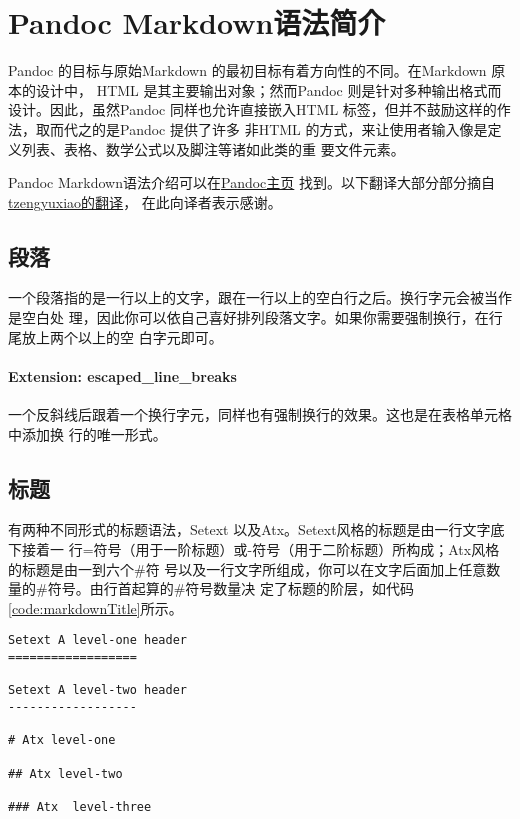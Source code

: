 \documentclass[cn]{elegantbook}
\begin{document}
\hypertarget{pandoc-markdownux8bedux6cd5ux7b80ux4ecb}{%
\chapter{Pandoc
Markdown语法简介}\label{pandoc-markdownux8bedux6cd5ux7b80ux4ecb}}

Pandoc 的目标与原始Markdown 的最初目标有着方向性的不同。在Markdown
原本的设计中， HTML 是其主要输出对象；然而Pandoc
则是针对多种输出格式而设计。因此，虽然Pandoc 同样也允许直接嵌入HTML
标签，但并不鼓励这样的作法，取而代之的是Pandoc 提供了许多 非HTML
的方式，来让使用者输入像是定义列表、表格、数学公式以及脚注等诸如此类的重
要文件元素。

Pandoc
Markdown语法介绍可以在\href{http://www.pandoc.org/MANUAL.html\#pandocs-markdown}{Pandoc主页}
找到。以下翻译大部分部分摘自\href{http://pages.tzengyuxio.me/pandoc/}{tzengyuxiao的翻译}，
在此向译者表示感谢。

\hypertarget{ux6bb5ux843d}{%
\section{段落}\label{ux6bb5ux843d}}

一个段落指的是一行以上的文字，跟在一行以上的空白行之后。换行字元会被当作是空白处
理，因此你可以依自己喜好排列段落文字。如果你需要强制换行，在行尾放上两个以上的空
白字元即可。

\hypertarget{extension-escaped_line_breaks}{%
\subsubsection{Extension:
escaped\_line\_breaks}\label{extension-escaped_line_breaks}}

一个反斜线后跟着一个换行字元，同样也有强制换行的效果。这也是在表格单元格中添加换
行的唯一形式。

\hypertarget{ux6807ux9898}{%
\section{标题}\label{ux6807ux9898}}

有两种不同形式的标题语法，Setext
以及Atx。Setext风格的标题是由一行文字底下接着一
行=符号（用于一阶标题）或-符号（用于二阶标题）所构成；Atx风格的标题是由一到六个\#符
号以及一行文字所组成，你可以在文字后面加上任意数量的\#符号。由行首起算的\#符号数量决
定了标题的阶层，如代码\ref{code:markdownTitle}所示。

\begin{lstlisting}[caption=测试, label=code:markdownTitle, float=htbp]
Setext A level-one header
==================

Setext A level-two header
------------------

# Atx level-one

## Atx level-two

### Atx  level-three
\end{lstlisting}
\end{document}
